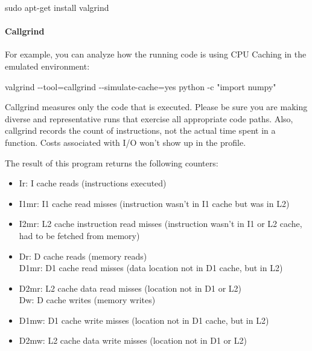 \documentclass[
]{article}
\newenvironment{Shaded}{}{}
\newcommand{\AttributeTok}[1]{\textcolor[rgb]{0.49,0.56,0.16}{#1}}
\newcommand{\FunctionTok}[1]{\textcolor[rgb]{0.02,0.16,0.49}{#1}}
\newcommand{\NormalTok}[1]{#1}
\newcommand{\OperatorTok}[1]{\textcolor[rgb]{0.40,0.40,0.40}{#1}}
\newcommand{\StringTok}[1]{\textcolor[rgb]{0.25,0.44,0.63}{#1}}
\begin{document}
\begin{Shaded}
\begin{Highlighting}[]
\FunctionTok{sudo}\NormalTok{  apt{-}get install valgrind}
\end{Highlighting}
\end{Shaded}

\hypertarget{callgrind}{%
\paragraph{Callgrind}\label{callgrind}}

For example, you can analyze how the running code is using CPU Caching
in the emulated environment:

\begin{Shaded}
\begin{Highlighting}[]
\FunctionTok{valgrind} \AttributeTok{{-}{-}tool}\OperatorTok{=}\NormalTok{callgrind }\AttributeTok{{-}{-}simulate{-}cache}\OperatorTok{=}\NormalTok{yes python }\AttributeTok{{-}c} \StringTok{"import numpy"}
\end{Highlighting}
\end{Shaded}

Callgrind measures only the code that is executed. Please be sure you
are making diverse and representative runs that exercise all appropriate
code paths. Also, callgrind records the count of instructions, not the
actual time spent in a function. Costs associated with I/O won't show up
in the profile.

The result of this program returns the following counters:

\begin{itemize}
\item
  Ir: I cache reads (instructions executed)
\item
  I1mr: I1 cache read misses (instruction wasn't in I1 cache but was in
  L2)
\item
  I2mr: L2 cache instruction read misses (instruction wasn't in I1 or L2
  cache, had to be fetched from memory)
\item
  Dr: D cache reads (memory reads)\\
  D1mr: D1 cache read misses (data location not in D1 cache, but in L2)
\item
  D2mr: L2 cache data read misses (location not in D1 or L2)\\
  Dw: D cache writes (memory writes)
\item
  D1mw: D1 cache write misses (location not in D1 cache, but in L2)
\item
  D2mw: L2 cache data write misses (location not in D1 or L2)
\end{itemize}
\end{document}
